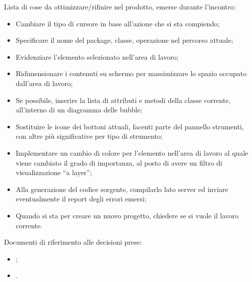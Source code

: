 \documentclass[../AnalisiDeiRequisiti.tex]{subfiles}
\begin{document}
		Lista di cose da ottimizzare/rifinire nel prodotto, emerse durante l'incontro:
		\begin{itemize}
			\item Cambiare il tipo di cursore in base all'azione che si sta compiendo;
			\item Specificare il nome del package, classe, operazione nel percorso attuale;
			\item Evidenziare l'elemento selezionato nell'area di lavoro;
			\item Ridimensionare i contenuti su schermo per massimizzare lo spazio occupato dall'area di lavoro;
			\item Se possibile, inserire la lista di attributi e metodi della classe corrente, all'interno di un
			diagramma delle bubble;
			\item Sostituire le icone dei bottoni attuali, facenti parte del pannello strumenti, con altre più
			significative per tipo di strumento;
			\item Implementare un cambio di colore per l'elemento nell'area di lavoro al quale viene cambiato il
			grado di importanza, al posto di avere un filtro di visualizzazione ``a layer'';
			\item Alla generazione del codice sorgente, compilarlo lato server ed inviare eventualmente il report
			degli errori emersi;
			\item Quando si sta per creare un nuovo progetto, chiedere se si vuole il lavoro corrente.
		\end{itemize}
		Documenti di riferimento alle decisioni prese:
		\begin{itemize}
			\item \analisideirequisitiv;
			\item \pianodiprogettov.
		\end{itemize}
\end{document}

